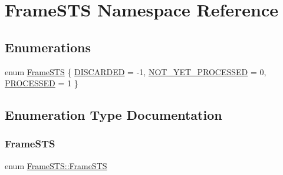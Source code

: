 \hypertarget{namespaceFrameSTS}{}\section{Frame\+S\+TS Namespace Reference}
\label{namespaceFrameSTS}
\subsection*{Enumerations}
\begin{DoxyCompactItemize}
\item 
enum \hyperlink{namespaceFrameSTS_aa00e1583f3bc837ad3fbfb9beaaa0692}{Frame\+S\+TS} \{ \hyperlink{namespaceFrameSTS_aa00e1583f3bc837ad3fbfb9beaaa0692a8608718df5a4cb285e39336cb325e5b9}{D\+I\+S\+C\+A\+R\+D\+ED} = -\/1, 
\hyperlink{namespaceFrameSTS_aa00e1583f3bc837ad3fbfb9beaaa0692a8320d47ecf7adbfb6dedd682bf1820db}{N\+O\+T\+\_\+\+Y\+E\+T\+\_\+\+P\+R\+O\+C\+E\+S\+S\+ED} = 0, 
\hyperlink{namespaceFrameSTS_aa00e1583f3bc837ad3fbfb9beaaa0692a68c0ae2c9cca0d93791d8493061f4d95}{P\+R\+O\+C\+E\+S\+S\+ED} = 1
 \}
\end{DoxyCompactItemize}


\subsection{Enumeration Type Documentation}
\mbox{\label{namespaceFrameSTS_aa00e1583f3bc837ad3fbfb9beaaa0692}} 
\subsubsection{\texorpdfstring{Frame\+S\+TS}{FrameSTS}}
{\footnotesize\ttfamily enum \hyperlink{namespaceFrameSTS_aa00e1583f3bc837ad3fbfb9beaaa0692}{Frame\+S\+T\+S\+::\+Frame\+S\+TS}}

